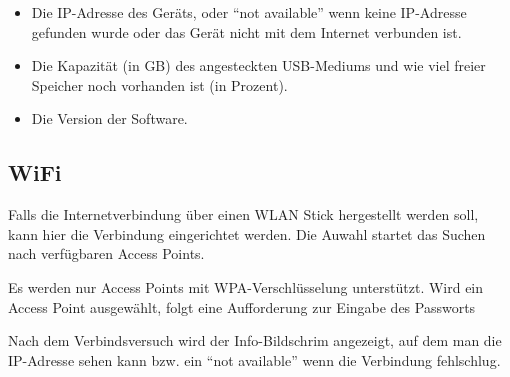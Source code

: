 \documentclass[12pt,a4paper,openany]{memoir}
\begin{document}

\begin{itemize}
 \item Die IP-Adresse des Geräts, oder ``not available'' wenn keine IP-Adresse gefunden wurde oder das Gerät nicht mit dem Internet verbunden ist.
 \item Die Kapazität (in GB) des angesteckten USB-Mediums und wie viel freier Speicher noch vorhanden ist (in Prozent).
 \item Die Version der Software.
\end{itemize}


\subsection{WiFi}
Falls die Internetverbindung über einen WLAN Stick hergestellt werden soll, kann hier die Verbindung eingerichtet werden. Die Auwahl startet das Suchen nach verfügbaren Access Points.


Es werden nur Access Points mit WPA-Verschlüsselung unterstützt.
Wird ein Access Point ausgewählt, folgt eine Aufforderung zur Eingabe des Passworts


Nach dem Verbindsversuch wird der Info-Bildschrim angezeigt, auf dem man die IP-Adresse sehen kann bzw. ein ``not available'' wenn die Verbindung fehlschlug. 
\end{document}
